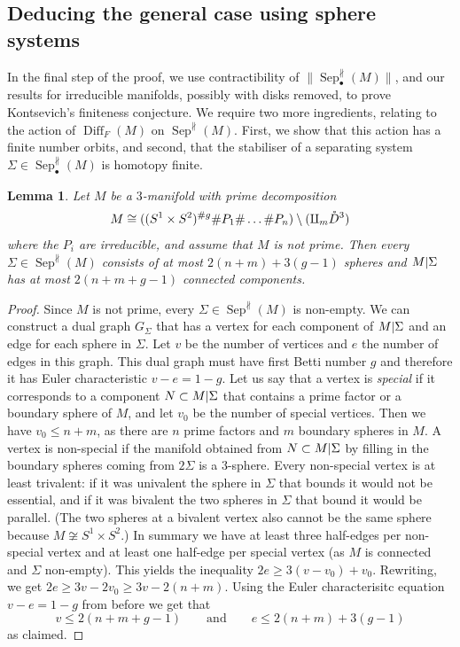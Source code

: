 \documentclass{amsart}
\theoremstyle{plain}
\newtheorem{lem}[thm]{Lemma}
\theoremstyle{definition}
\DeclareMathOperator\Diff{Diff}
\newcommand{\interior}[1]{\smash{\mathring{#1}}}
\DeclareMathOperator\sep{Sep} %
\newcommand{\sepNP}{\sep^{\nparallel}} %
\newcommand{\ca}{\smash{\mid}} %
\begin{document}
\subsection{Deducing the general case using sphere systems}

In the final step of the proof, we use contractibility of $\|\sepNP_\bullet(M)\|$, and our results for irreducible manifolds, possibly with disks removed, to prove Kontsevich's finiteness conjecture. We require two more ingredients, relating to the action of $\Diff_F(M)$ on $\sepNP(M)$. First, we show that this action has a finite number orbits, and second, that the stabiliser of a separating system $\Sigma \in \sepNP_\bullet(M)$ is homotopy finite.



\begin{lem}\label{lem:bounding-graphs}
    Let $M$ be a $3$-manifold with prime decomposition
    $$M \cong ((S^1 \times S^2)^{\# g} \# P_1 \# \dots \# P_n) \setminus (\amalg_m \interior{D}^3)$$ 
    where the $P_i$ are irreducible, and assume that $M$ is not prime.
    Then every $\Sigma \in \sepNP(M)$ consists of at most $2(n+m) + 3(g-1)$ spheres and $M \ca \Sigma$ has at most $2(n+m+g-1)$ connected components.
\end{lem}
\begin{proof}
    Since $M$ is not prime, every $\Sigma \in \sepNP(M)$ is non-empty.
    We can construct a dual graph $G_\Sigma$ that has a vertex for each component of $M \ca \Sigma$ and an edge for each sphere in $\Sigma$.
    Let $v$ be the number of vertices and $e$ the number of edges in this graph.
    This dual graph must have first Betti number $g$ and therefore it has Euler characteristic $v-e = 1-g$.
    Let us say that a vertex is \emph{special} if it corresponds to a component $N \subset M \ca \Sigma$ that contains a prime factor or a boundary sphere of $M$, and let $v_0$ be the number of special vertices.
    Then we have $v_0 \le n+m$, as there are $n$ prime factors and $m$ boundary spheres in $M$.
    A vertex is non-special if the manifold obtained from $N \subset M \ca \Sigma$ by filling in the boundary spheres coming from $2\Sigma$ is a $3$-sphere.
    Every non-special vertex is at least trivalent:
    if it was univalent the sphere in $\Sigma$ that bounds it would not be essential, 
    and if it was bivalent the two spheres in $\Sigma$ that bound it would be parallel.
    (The two spheres at a bivalent vertex also cannot be the same sphere because $M \not\cong S^1 \times S^2$.)
    In summary we have at least three half-edges per non-special vertex and at least one half-edge per special vertex (as $M$ is connected and $\Sigma$ non-empty).
    This yields the inequality $2e \ge 3(v-v_0) + v_0$.
    Rewriting, we get $2e \ge 3v - 2v_0 \ge 3v - 2(n+m)$.
    Using the Euler characterisitc equation $v-e=1-g$ from before we get that
    \[
        v \le 2(n+m+g-1) 
        \qquad\text{and}\qquad
        e \le 2(n+m) + 3(g-1)
    \]
    as claimed.
\end{proof}
\end{document}
